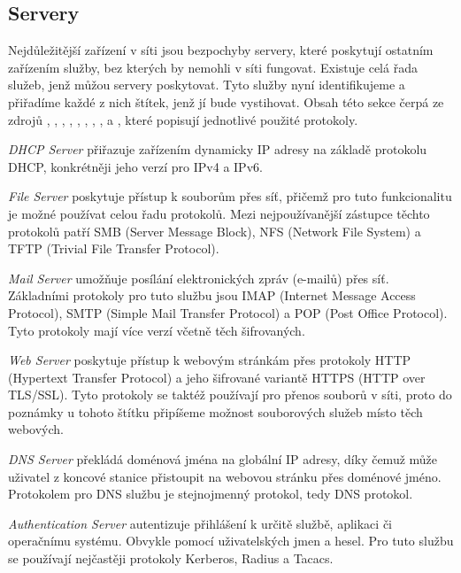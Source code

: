 \documentclass[thesis=B,czech,hidelinks]{FITthesis}[2019/03/21]
\begin{document}
\subsection{Servery}
        Nejdůležitější zařízení v síti jsou bezpochyby servery, které poskytují ostatním zařízením služby, bez kterých by nemohli v síti fungovat. Existuje celá řada služeb, jenž můžou servery poskytovat. Tyto služby nyní identifikujeme a přiřadíme každé z nich štítek, jenž jí bude vystihovat. Obsah této sekce čerpá ze zdrojů \cite{IANA}, \cite{FILEP}, \cite{FILEtftp}, \cite{FILEnfs}, \cite{MAILP}, \cite{AuthentificateP}, \cite{Kerberos}, \cite{Radius}, a \cite{LDAPP}, které popisují jednotlivé použité protokoly.
        \begin{description}
            \item\emph{DHCP Server}  přiřazuje zařízením dynamicky IP adresy na základě protokolu DHCP, konkrétněji jeho verzí pro IPv4 a IPv6. 
            
            \item\emph{File Server}  poskytuje přístup k souborům přes síť, přičemž pro tuto funkcionalitu je možné používat celou řadu protokolů. Mezi nejpoužívanější zástupce těchto protokolů patří SMB (Server Message Block), NFS (Network File System) a TFTP (Trivial File Transfer Protocol). 
            
            \item\emph{Mail Server}  umožňuje posílání elektronických zpráv (e-mailů) přes síť. Základními protokoly pro tuto službu jsou IMAP (Internet Message Access Protocol), SMTP (Simple Mail Transfer Protocol) a POP (Post Office Protocol). Tyto protokoly mají více verzí včetně těch šifrovaných. 
            
            \item\emph{Web Server}  poskytuje přístup k webovým stránkám přes protokoly HTTP (Hypertext Transfer Protocol) a jeho šifrované variantě HTTPS (HTTP over TLS/SSL). Tyto protokoly se taktéž používají pro přenos souborů v síti, proto do poznámky u tohoto štítku připíšeme možnost souborových služeb místo těch webových.
            
            \item\emph{DNS Server}  překládá doménová jména na globální IP adresy, díky čemuž může uživatel z koncové stanice přistoupit na webovou stránku přes doménové jméno. Protokolem pro DNS službu je stejnojmenný protokol, tedy DNS protokol.
            
            \item\emph{Authentication Server}  autentizuje přihlášení k určitě službě, aplikaci či operačnímu systému. Obvykle pomocí uživatelských jmen a hesel. Pro tuto službu se používají nejčastěji protokoly Kerberos, Radius a Tacacs. 
            

\end{description}
\end{document}
